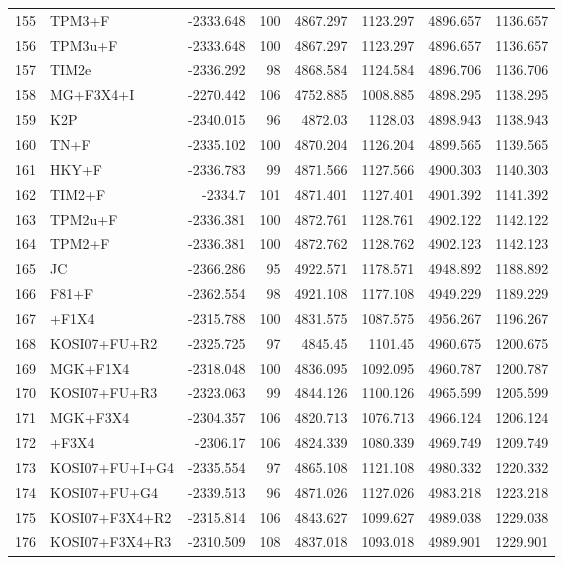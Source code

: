 \begin{longtable}{clrrrrrr}
	155 & TPM3+F & -2333.648 & 100 & 4867.297 & 1123.297 & 4896.657 & 1136.657 \\ 
	156 & TPM3u+F & -2333.648 & 100 & 4867.297 & 1123.297 & 4896.657 & 1136.657 \\ 
	157 & TIM2e & -2336.292 & 98 & 4868.584 & 1124.584 & 4896.706 & 1136.706 \\ 
	158 & MG+F3X4+I & -2270.442 & 106 & 4752.885 & 1008.885 & 4898.295 & 1138.295 \\ 
	159 & K2P & -2340.015 & 96 & 4872.03 & 1128.03 & 4898.943 & 1138.943 \\ 
	160 & TN+F & -2335.102 & 100 & 4870.204 & 1126.204 & 4899.565 & 1139.565 \\ 
	161 & HKY+F & -2336.783 & 99 & 4871.566 & 1127.566 & 4900.303 & 1140.303 \\ 
	162 & TIM2+F & -2334.7 & 101 & 4871.401 & 1127.401 & 4901.392 & 1141.392 \\ 
	163 & TPM2u+F & -2336.381 & 100 & 4872.761 & 1128.761 & 4902.122 & 1142.122 \\ 
	164 & TPM2+F & -2336.381 & 100 & 4872.762 & 1128.762 & 4902.123 & 1142.123 \\ 
	165 & JC & -2366.286 & 95 & 4922.571 & 1178.571 & 4948.892 & 1188.892 \\ 
	166 & F81+F & -2362.554 & 98 & 4921.108 & 1177.108 & 4949.229 & 1189.229 \\ 
	167 & \gy+F1X4 & -2315.788 & 100 & 4831.575 & 1087.575 & 4956.267 & 1196.267 \\ 
	168 & KOSI07+FU+R2 & -2325.725 & 97 & 4845.45 & 1101.45 & 4960.675 & 1200.675 \\ 
	169 & MGK+F1X4 & -2318.048 & 100 & 4836.095 & 1092.095 & 4960.787 & 1200.787 \\ 
	170 & KOSI07+FU+R3 & -2323.063 & 99 & 4844.126 & 1100.126 & 4965.599 & 1205.599 \\ 
	171 & MGK+F3X4 & -2304.357 & 106 & 4820.713 & 1076.713 & 4966.124 & 1206.124 \\ 
	172 & \gy+F3X4 & -2306.17 & 106 & 4824.339 & 1080.339 & 4969.749 & 1209.749 \\ 
	173 & KOSI07+FU+I+G4 & -2335.554 & 97 & 4865.108 & 1121.108 & 4980.332 & 1220.332 \\ 
	174 & KOSI07+FU+G4 & -2339.513 & 96 & 4871.026 & 1127.026 & 4983.218 & 1223.218 \\ 
	175 & KOSI07+F3X4+R2 & -2315.814 & 106 & 4843.627 & 1099.627 & 4989.038 & 1229.038 \\ 
	176 & KOSI07+F3X4+R3 & -2310.509 & 108 & 4837.018 & 1093.018 & 4989.901 & 1229.901 \\ 

\end{longtable}
